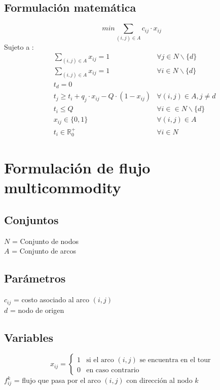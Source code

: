 \documentclass{article}
\numberwithin{equation}{section}
\begin{document}
\subsection{Formulación matemática}
\begin{equation}
min \sum_{(i,j) \in A} c_{ij} \cdot x_{ij}
\end{equation}
Sujeto a : \begin{align}
& \sum_{(i,j) \in A} x_{ij} = 1 &\forall j \in N\backslash \{d\} \\
& \sum_{(i,j) \in A} x_{ij} = 1 &\forall i \in N\backslash \{d\} \\
& t_{d} = 0\\
& t_{j} \geq t_{i} + q_{j} \cdot x_{ij} - Q \cdot (1 - x_{ij}) & \forall (i,j) \in A, j \neq d\\
& t_{i} \leq Q & \forall i \in \in N\backslash \{d\}\\
& x_{ij} \in \{0,1\} &\forall (i,j) \in A\\
& t_{i} \in \mathbb{R}^{+}_{0} &\forall i \in N
\end{align}

\newpage
\section{Formulación de flujo multicommodity}
\subsection{Conjuntos}
$N$ = Conjunto de nodos\\
$A$ = Conjunto de arcos
\subsection{Parámetros}
$c_{ij}$ = costo asociado al arco $(i,j)$\\
$d$ = nodo de origen
\subsection{Variables}
\begin{center}
\[x_{ij}={\begin{cases}1&{\mbox{si el arco $(i,j)$ se encuentra en el tour}}\\0&{\mbox{en caso contrario}}\end{cases}}
\]
$f_{ij}^k$ = flujo que pasa por el arco $(i,j)$ con dirección al nodo $k$
\end{center}
\end{document}
